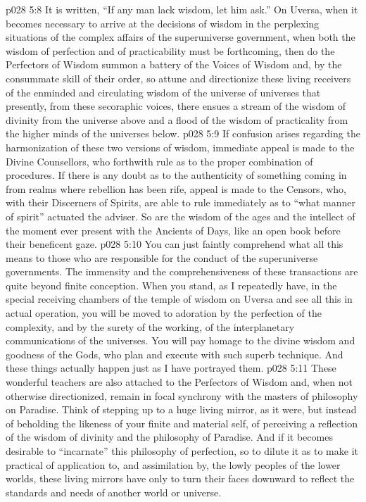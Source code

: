 \vs p028 5:8 It is written, “If any man lack wisdom, let him ask.” On Uversa, when it becomes necessary to arrive at the decisions of wisdom in the perplexing situations of the complex affairs of the superuniverse government, when both the wisdom of perfection and of practicability must be forthcoming, then do the Perfectors of Wisdom summon a battery of the Voices of Wisdom and, by the consummate skill of their order, so attune and directionize these living receivers of the enminded and circulating wisdom of the universe of universes that presently, from these secoraphic voices, there ensues a stream of the wisdom of divinity from the universe above and a flood of the wisdom of practicality from the higher minds of the universes below.
\vs p028 5:9 If confusion arises regarding the harmonization of these two versions of wisdom, immediate appeal is made to the Divine Counsellors, who forthwith rule as to the proper combination of procedures. If there is any doubt as to the authenticity of something coming in from realms where rebellion has been rife, appeal is made to the Censors, who, with their Discerners of Spirits, are able to rule immediately as to “what manner of spirit” actuated the adviser. So are the wisdom of the ages and the intellect of the moment ever present with the Ancients of Days, like an open book before their beneficent gaze.
\vs p028 5:10 You can just faintly comprehend what all this means to those who are responsible for the conduct of the superuniverse governments. The immensity and the comprehensiveness of these transactions are quite beyond finite conception. When you stand, as I repeatedly have, in the special receiving chambers of the temple of wisdom on Uversa and see all this in actual operation, you will be moved to adoration by the perfection of the complexity, and by the surety of the working, of the interplanetary communications of the universes. You will pay homage to the divine wisdom and goodness of the Gods, who plan and execute with such superb technique. And these things actually happen just as I have portrayed them.
\vs p028 5:11 \bibnobreakspace {} These wonderful teachers are also attached to the Perfectors of Wisdom and, when not otherwise directionized, remain in focal synchrony with the masters of philosophy on Paradise. Think of stepping up to a huge living mirror, as it were, but instead of beholding the likeness of your finite and material self, of perceiving a reflection of the wisdom of divinity and the philosophy of Paradise. And if it becomes desirable to “incarnate” this philosophy of perfection, so to dilute it as to make it practical of application to, and assimilation by, the lowly peoples of the lower worlds, these living mirrors have only to turn their faces downward to reflect the standards and needs of another world or universe.

